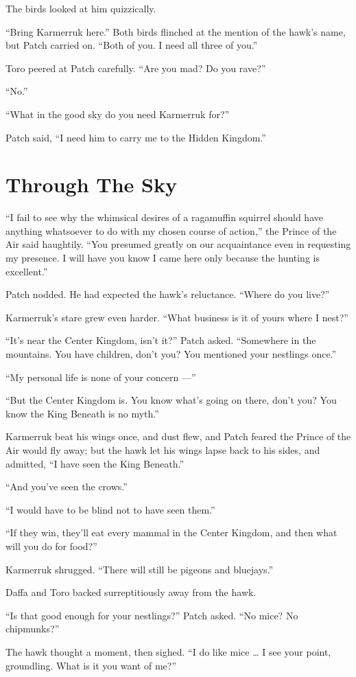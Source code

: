 \documentclass[ebook,oneside,openany,17pt]{memoir}
\renewcommand{\thechapter}{\Roman{chapter}}
\newcounter{sections}
\newcommand{\sections}[1]{%
  \section*{#1}
  \addtocounter{sections}{1}%
  \pdfbookmark[1]{#1}{section.\thechapter.\thesections}}
\begin{document}
The birds looked at him quizzically.

“Bring Karmerruk here.” Both birds flinched at the mention of the
hawk’s name, but Patch carried on. “Both of you. I need all three of
you.”

Toro peered at Patch carefully. “Are you mad? Do you rave?”

“No.”

“What in the good sky do you need Karmerruk for?”

Patch said, “I need him to carry me to the Hidden Kingdom.”


\sections{Through The Sky}

“I fail to see why the whimsical desires of a ragamuffin squirrel
should have anything whatsoever to do with my chosen course of
action,” the Prince of the Air said haughtily. “You presumed greatly
on our acquaintance even in requesting my presence. I will have you
know I came here only because the hunting is excellent.”

Patch nodded. He had expected the hawk’s reluctance. “Where do you
live?”

Karmerruk’s stare grew even harder. “What business is it of yours
where I nest?”

“It’s near the Center Kingdom, isn’t it?” Patch asked. “Somewhere in
the mountains. You have children, don’t you? You mentioned your
nestlings once.”

“My personal life is none of your concern —”

“But the Center Kingdom is. You know what’s going on there, don’t you?
You know the King Beneath is no myth.”

Karmerruk beat his wings once, and dust flew, and Patch feared the
Prince of the Air would fly away; but the hawk let his wings lapse
back to his sides, and admitted, “I have seen the King Beneath.”

“And you’ve seen the crows.”

“I would have to be blind not to have seen them.”

“If they win, they’ll eat every mammal in the Center Kingdom, and then
what will you do for food?”

Karmerruk shrugged. “There will still be pigeons and bluejays.”

Daffa and Toro backed surreptitiously away from the hawk.

“Is that good enough for your nestlings?” Patch asked. “No mice? No
chipmunks?”

The hawk thought a moment, then sighed. “I do like mice … I see your
point, groundling. What is it you want of me?”
\end{document}
